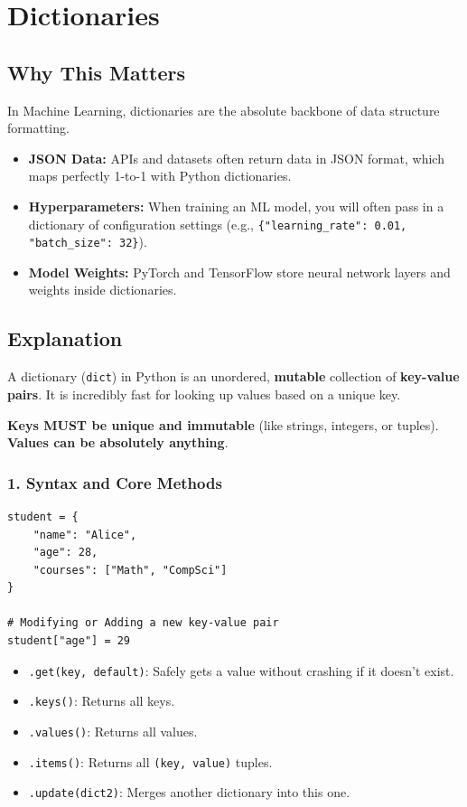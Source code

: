 \chapter{Dictionaries}

\section{Why This Matters}
In Machine Learning, dictionaries are the absolute backbone of data structure formatting.
\begin{itemize}
    \item \textbf{JSON Data:} APIs and datasets often return data in JSON format, which maps perfectly 1-to-1 with Python dictionaries.
    \item \textbf{Hyperparameters:} When training an ML model, you will often pass in a dictionary of configuration settings (e.g., \texttt{\{"learning\_rate": 0.01, "batch\_size": 32\}}).
    \item \textbf{Model Weights:} PyTorch and TensorFlow store neural network layers and weights inside dictionaries.
\end{itemize}

\section{Explanation}
A dictionary (\texttt{dict}) in Python is an unordered, \textbf{mutable} collection of \textbf{key-value pairs}. It is incredibly fast for looking up values based on a unique key. 

\textbf{Keys MUST be unique and immutable} (like strings, integers, or tuples).
\textbf{Values can be absolutely anything}.

\subsection{1. Syntax and Core Methods}
\begin{lstlisting}
student = {
    "name": "Alice",
    "age": 28,
    "courses": ["Math", "CompSci"]
}

# Modifying or Adding a new key-value pair
student["age"] = 29
\end{lstlisting}

\begin{itemize}
    \item \texttt{.get(key, default)}: Safely gets a value without crashing if it doesn't exist.
    \item \texttt{.keys()}: Returns all keys.
    \item \texttt{.values()}: Returns all values.
    \item \texttt{.items()}: Returns all \texttt{(key, value)} tuples.
    \item \texttt{.update(dict2)}: Merges another dictionary into this one.
\end{itemize}

